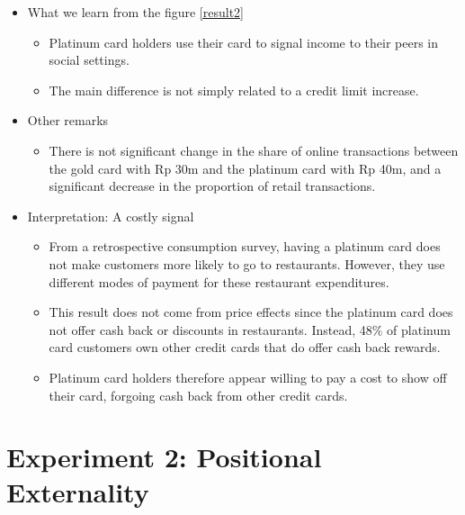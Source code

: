 \documentclass[../root]{subfiles}
\begin{document}
    \begin{itemize}
        \item What we learn from the figure \ref{result2}
        \begin{itemize}
            \item Platinum card holders use their card to signal income to their peers in social settings.
            \item The main difference is not simply related to a credit limit increase. 
        \end{itemize}
        \item Other remarks
        \begin{itemize}
            \item There is not significant change in the share of online transactions between the gold card with Rp 30m and the platinum card with Rp 40m, and a significant decrease in the proportion of retail transactions.
        \end{itemize}
        \item Interpretation: A costly signal
        \begin{itemize}
            \item From a retrospective consumption survey, having a platinum card does not make customers more likely to go to restaurants. However, they use different modes of payment for these restaurant expenditures.
            \item This result does not come from price effects since the platinum card does not offer cash back or discounts in restaurants. Instead, 48\% of platinum card customers own other credit cards that do offer cash back rewards.  
            \item Platinum card holders therefore appear willing to pay a cost to show off their card, forgoing cash back from other credit cards.
        \end{itemize}
    \end{itemize}


    \section{Experiment 2: Positional Externality}
\end{document}
